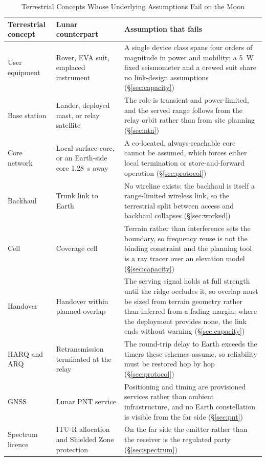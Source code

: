 \documentclass[11pt,a4paper]{article}
\begin{document}
\begin{table}[!t]
\caption{Terrestrial Concepts Whose Underlying Assumptions Fail on the Moon}
\label{tab:terminology}
\centering
\footnotesize
\begin{tabularx}{\textwidth}{@{}>{\raggedright\arraybackslash}p{2.4cm}>{\raggedright\arraybackslash}p{4.1cm}>{\raggedright\arraybackslash}X@{}}
\toprule
Terrestrial concept & Lunar counterpart & Assumption that fails \\
\midrule
User equipment & Rover, EVA suit, emplaced instrument & A single device class spans four orders of magnitude in power and mobility; a \SI{5}{W} fixed seismometer and a crewed suit share no link-design assumptions (\S\ref{sec:capacity}) \\
Base station & Lander, deployed mast, or relay satellite & The role is transient and power-limited, and the served range follows from the relay orbit rather than from site planning (\S\ref{sec:ntn}) \\
Core network & Local surface core, or an Earth-side core \SI{1.28}{\second} away & A co-located, always-reachable core cannot be assumed, which forces either local termination or store-and-forward operation (\S\ref{sec:protocol}) \\
Backhaul & Trunk link to Earth & No wireline exists: the backhaul is itself a range-limited wireless link, so the terrestrial split between access and backhaul collapses (\S\ref{sec:worked}) \\
Cell & Coverage cell & Terrain rather than interference sets the boundary, so frequency reuse is not the binding constraint and the planning tool is a ray tracer over an elevation model (\S\ref{sec:capacity}) \\
Handover & Handover within planned overlap & The serving signal holds at full strength until the ridge occludes it, so overlap must be sized from terrain geometry rather than inferred from a fading margin; where the deployment provides none, the link ends without warning (\S\ref{sec:capacity}) \\
HARQ and ARQ & Retransmission terminated at the relay & The round-trip delay to Earth exceeds the timers these schemes assume, so reliability must be restored hop by hop (\S\ref{sec:protocol}) \\
GNSS & Lunar PNT service & Positioning and timing are provisioned services rather than ambient infrastructure, and no Earth constellation is visible from the far side (\S\ref{sec:pnt}) \\
Spectrum licence & ITU-R allocation and Shielded Zone protection & On the far side the emitter rather than the receiver is the regulated party (\S\ref{sec:spectrum}) \\
\bottomrule
\end{tabularx}
\end{table}
\end{document}
